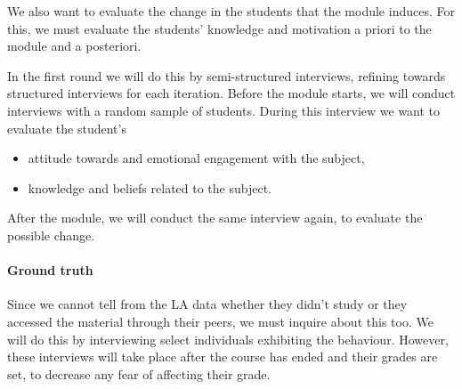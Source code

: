 We also want to evaluate the change in the students that the module induces.
For this, we must evaluate the students' knowledge and motivation a priori to 
the module and a posteriori.

In the first round we will do this by semi-structured interviews, refining 
towards structured interviews for each iteration.
Before the module starts, we will conduct interviews with a random sample of 
students.
During this interview we want to evaluate the student's
\begin{itemize}
  \item attitude towards and emotional engagement with the subject,
  \item knowledge and beliefs related to the subject.
\end{itemize}

After the module, we will conduct the same interview again, to evaluate the 
possible change.

\paragraph{Ground truth}

Since we cannot tell from the \ac{LA} data whether they didn't study or they 
accessed the material through their peers, we must inquire about this too.
We will do this by interviewing select individuals exhibiting the behaviour.
However, these interviews will take place after the course has ended and their 
grades are set, to decrease any fear of affecting their grade.
